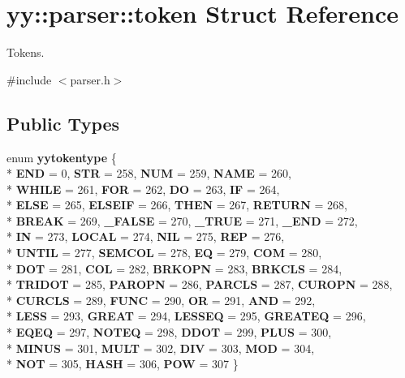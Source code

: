 \hypertarget{structyy_1_1parser_1_1token}{}\section{yy\+:\+:parser\+:\+:token Struct Reference}
\label{structyy_1_1parser_1_1token}


Tokens.  




{\ttfamily \#include $<$parser.\+h$>$}

\subsection*{Public Types}
\begin{DoxyCompactItemize}
\item 
\hypertarget{structyy_1_1parser_1_1token_a90b63e7f9dd7177dd3bf01c58c408475}{}enum {\bfseries yytokentype} \{ \\*
{\bfseries E\+N\+D} = 0, 
{\bfseries S\+T\+R} = 258, 
{\bfseries N\+U\+M} = 259, 
{\bfseries N\+A\+M\+E} = 260, 
\\*
{\bfseries W\+H\+I\+L\+E} = 261, 
{\bfseries F\+O\+R} = 262, 
{\bfseries D\+O} = 263, 
{\bfseries I\+F} = 264, 
\\*
{\bfseries E\+L\+S\+E} = 265, 
{\bfseries E\+L\+S\+E\+I\+F} = 266, 
{\bfseries T\+H\+E\+N} = 267, 
{\bfseries R\+E\+T\+U\+R\+N} = 268, 
\\*
{\bfseries B\+R\+E\+A\+K} = 269, 
{\bfseries \+\_\+\+F\+A\+L\+S\+E} = 270, 
{\bfseries \+\_\+\+T\+R\+U\+E} = 271, 
{\bfseries \+\_\+\+E\+N\+D} = 272, 
\\*
{\bfseries I\+N} = 273, 
{\bfseries L\+O\+C\+A\+L} = 274, 
{\bfseries N\+I\+L} = 275, 
{\bfseries R\+E\+P} = 276, 
\\*
{\bfseries U\+N\+T\+I\+L} = 277, 
{\bfseries S\+E\+M\+C\+O\+L} = 278, 
{\bfseries E\+Q} = 279, 
{\bfseries C\+O\+M} = 280, 
\\*
{\bfseries D\+O\+T} = 281, 
{\bfseries C\+O\+L} = 282, 
{\bfseries B\+R\+K\+O\+P\+N} = 283, 
{\bfseries B\+R\+K\+C\+L\+S} = 284, 
\\*
{\bfseries T\+R\+I\+D\+O\+T} = 285, 
{\bfseries P\+A\+R\+O\+P\+N} = 286, 
{\bfseries P\+A\+R\+C\+L\+S} = 287, 
{\bfseries C\+U\+R\+O\+P\+N} = 288, 
\\*
{\bfseries C\+U\+R\+C\+L\+S} = 289, 
{\bfseries F\+U\+N\+C} = 290, 
{\bfseries O\+R} = 291, 
{\bfseries A\+N\+D} = 292, 
\\*
{\bfseries L\+E\+S\+S} = 293, 
{\bfseries G\+R\+E\+A\+T} = 294, 
{\bfseries L\+E\+S\+S\+E\+Q} = 295, 
{\bfseries G\+R\+E\+A\+T\+E\+Q} = 296, 
\\*
{\bfseries E\+Q\+E\+Q} = 297, 
{\bfseries N\+O\+T\+E\+Q} = 298, 
{\bfseries D\+D\+O\+T} = 299, 
{\bfseries P\+L\+U\+S} = 300, 
\\*
{\bfseries M\+I\+N\+U\+S} = 301, 
{\bfseries M\+U\+L\+T} = 302, 
{\bfseries D\+I\+V} = 303, 
{\bfseries M\+O\+D} = 304, 
\\*
{\bfseries N\+O\+T} = 305, 
{\bfseries H\+A\+S\+H} = 306, 
{\bfseries P\+O\+W} = 307
 \}\label{structyy_1_1parser_1_1token_a90b63e7f9dd7177dd3bf01c58c408475}

\end{DoxyCompactItemize}


